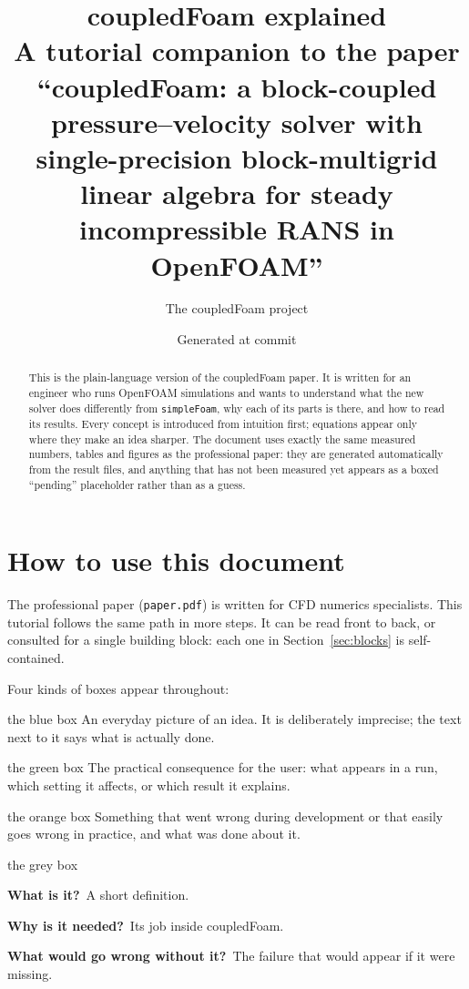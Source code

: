 \documentclass[11pt,a4paper]{article}
\title{\textbf{coupledFoam explained}\\[4pt]
  \large A tutorial companion to the paper ``coupledFoam: a block-coupled
  pressure--velocity solver with single-precision block-multigrid linear
  algebra for steady incompressible RANS in OpenFOAM''}
\author{The coupledFoam project}
\date{Generated at commit \texttt{\cfnum{Commit}}\cftitlenote}
\newcommand{\code}[1]{\texttt{#1}}
\newcommand{\bbwhat}{\par\smallskip\noindent\textbf{What is it?}\ }
\newcommand{\bbwhy}{\par\smallskip\noindent\textbf{Why is it needed?}\ }
\newcommand{\bbwithout}{\par\smallskip\noindent\textbf{What would go wrong
  without it?}\ }
\begin{document}
\maketitle

\begin{abstract}
This is the plain-language version of the coupledFoam paper. It is written
for an engineer who runs OpenFOAM simulations and wants to understand what
the new solver does differently from \code{simpleFoam}, why each of its
parts is there, and how to read its results. Every concept is introduced
from intuition first; equations appear only where they make an idea
sharper. The document uses exactly the same measured numbers, tables and
figures as the professional paper: they are generated automatically from
the result files, and anything that has not been measured yet appears as a
boxed ``pending'' placeholder rather than as a guess.
\end{abstract}

\tableofcontents

\section*{How to use this document}

The professional paper (\code{paper.pdf}) is written for CFD numerics
specialists. This tutorial follows the same path in more steps. It can
be read front to back, or consulted for a single building block: each one in
Section~\ref{sec:blocks} is self-contained.

Four kinds of boxes appear throughout:
\begin{intuition}{the blue box}
  An everyday picture of an idea. It is deliberately imprecise; the text
  next to it says what is actually done.
\end{intuition}
\begin{whyitmatters}{the green box}
  The practical consequence for the user: what appears in a run, which
  setting it affects, or which result it explains.
\end{whyitmatters}
\begin{pitfall}{the orange box}
  Something that went wrong during development or that easily goes wrong in
  practice, and what was done about it.
\end{pitfall}
\begin{bblock}{the grey box}
  \bbwhat A short definition.
  \bbwhy Its job inside coupledFoam.
  \bbwithout The failure that would appear if it were missing.
\end{bblock}
\end{document}
